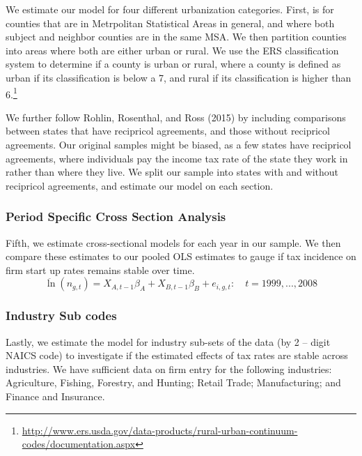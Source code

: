 We estimate our model for four different urbanization categories. First, is for counties that are in Metrpolitan Statistical Areas in general, and where both subject and neighbor counties are in the same MSA. We then partition counties into areas where both are  either urban or rural. We use the ERS classification system to determine if a county is urban or rural, where a county is defined as urban if its classification is below a 7, and rural if its classification is higher than 6.\footnote{\url{http://www.ers.usda.gov/data-products/rural-urban-continuum-codes/documentation.aspx}}

We further follow Rohlin, Rosenthal, and Ross (2015) by including comparisons between states that have recipricol agreements, and those without recipricol agreements. Our original samples might be biased, as a few states have recipricol agreements, where individuals pay the income tax rate of the state they work in rather than where they live. We split our sample into states with and without recipricol agreements, and estimate our model on each section.

\subsubsection{Period Specific Cross Section Analysis}
Fifth, we estimate cross-sectional models for each year in our sample. We then compare these estimates to our pooled OLS estimates to gauge if tax incidence on firm start up rates remains stable over time.
\begin{equation}\label{sense2}
\ddot \ln(n_{g,t})  = X_{A,t-1}\beta_{A}+X_{B,t-1}\beta_{B}+ e_{i,g,t}: \quad t = 1999,...,2008
\end{equation}

\subsubsection{Industry Sub codes}

Lastly, we estimate the model for industry sub-sets of the data (by 2 – digit NAICS code) to investigate if the estimated effects of tax rates are stable across industries.  We have sufficient data on firm entry for the following industries: Agriculture, Fishing, Forestry, and Hunting; Retail Trade; Manufacturing; and Finance and Insurance.
